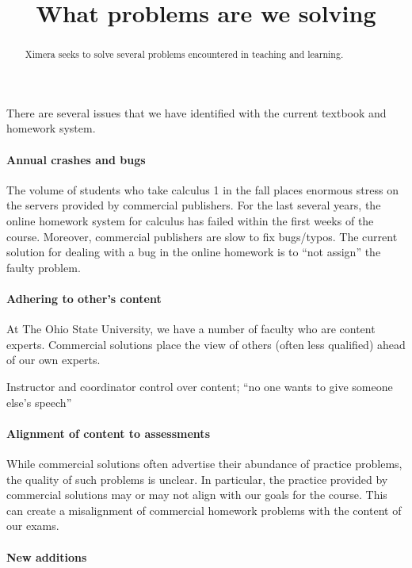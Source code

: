 \documentclass{ximera}
\title{What problems are we solving}
\begin{document}
\begin{abstract}
  Ximera seeks to solve several problems encountered in teaching and
  learning.
\end{abstract}
\maketitle

There are several issues that we have identified with the current
textbook and homework system.

\paragraph{Annual crashes and bugs}

The volume of students who take calculus 1 in the fall places enormous
stress on the servers provided by commercial publishers. For the last
several years, the online homework system for calculus has failed
within the first weeks of the course.  Moreover, commercial publishers
are slow to fix bugs/typos. The current solution for dealing with a
bug in the online homework is to ``not assign'' the faulty problem.


\paragraph{Adhering to other's content}

At The Ohio State University, we have a number of faculty who are
content experts. Commercial solutions place the view of others (often
less qualified) ahead of our own experts. 

Instructor and coordinator control over content; ``no one wants to give someone else's speech''

\paragraph{Alignment of content to assessments}

While commercial solutions often advertise their abundance of practice
problems, the quality of such problems is unclear. In particular, the
practice provided by commercial solutions may or may not align with
our goals for the course. This can create a misalignment of commercial
homework problems with the content of our exams.


\paragraph{New additions}
\end{document}
